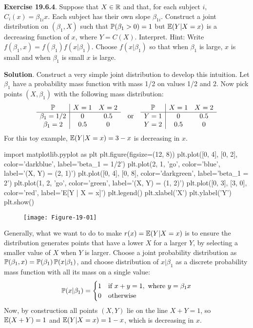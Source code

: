 \textbf{Exercise 19.6.4}. Suppose that \(X \in \mathbb{R}\) and that,
for each subject \(i\), \(C_{i}(x) = \beta_{1i}x\). Each subject has their
own slope \(\beta_{1i}\). Construct a joint distribution on
\((\beta_{1}, X)\) such that \(\operatorname{\mathbb{P}}(\beta_{1} > 0) = 1\) but
\(\operatorname{\mathbb{E}}(Y | X = x)\) is a decreasing function of \(x\), where
\(Y = C(X)\). Interpret.
Hint: Write \(f(\beta_{1}, x) = f(\beta_{1})f(x | \beta_{1})\). Choose
\(f(x | \beta_{1})\) so that when \(\beta_{1}\) is large, \(x\) is small and
when \(\beta_{1}\) is small \(x\) is large.

\textbf{Solution}.
Construct a very simple joint distribution to develop this
intuition. Let \(\beta_{1}\) have a probability mass function with mass
1/2 on values 1/2 and 2. Now  pick points \((X, \beta_{1})\) with the
following mass distribution:
\[
\begin{array}{c|cc}
\operatorname{\mathbb{P}} & X = 1 & X = 2 \\
\hline
\beta_{1} = 1/2 & 0 & 0.5 \\
\beta_{1} = 2 & 0.5 & 0 \\
\end{array}
\quad \text{or} \quad
\begin{array}{c|cc}
\operatorname{\mathbb{P}} & X = 1 & X = 2 \\
\hline
Y = 1 & 0 & 0.5 \\
Y = 2 & 0.5 & 0 \\
\end{array}
\]
For this toy example, \(\operatorname{\mathbb{E}}(Y | X = x) = 3 - x\) is decreasing in
\(x\).

\begin{python}
import matplotlib.pyplot as plt
plt.figure(figsize=(12, 8))
plt.plot([0, 4], [0, 2], color='darkblue', label='beta_{1} = 1/2')
plt.plot(2, 1, 'go', color='blue', label='(X, Y) = (2, 1)')
plt.plot([0, 4], [0, 8], color='darkgreen', label='beta_{1} = 2')
plt.plot(1, 2, 'go', color='green', label='(X, Y) = (1, 2)')
plt.plot([0, 3], [3, 0], color='red', label='E[Y | X = x]')
plt.legend()
plt.xlabel('X')
plt.ylabel('Y')
plt.show()
\end{python}

\begin{figure}[H]
\centering
\texttt{[image: Figure-19-01]}
\end{figure}

Generally, what we want to do to make \(r(x) = \operatorname{\mathbb{E}}(Y | X = x)\)
is to ensure the distribution generates points that have a lower \(X\)
for a larger \(Y\), by selecting a smaller value of \(X\) when \(Y\) is
larger.
Choose a joint probability distribution as
\(\operatorname{\mathbb{P}}(\beta_{1}, x) = \operatorname{\mathbb{P}}(\beta_{1}) \operatorname{\mathbb{P}}(x | \beta_{1})\),
and  choose distribution of \(x | \beta_{1}\) as a discrete
probability mass function with all its mass on a single value:
\[
\operatorname{\mathbb{P}}(x | \beta_{1}) = \begin{cases}
1 & \text{if } x + y = 1, \text{ where } y = \beta_{1} x\\
0 & \text{otherwise}
\end{cases}
\]
Now, by construction all points \((X, Y)\) lie on the line
\(X + Y = 1\), so \(\operatorname{\mathbb{E}}(X + Y) = 1\) and
\(\operatorname{\mathbb{E}}(Y | X = x) = 1 - x\), which is decreasing in \(x\).

